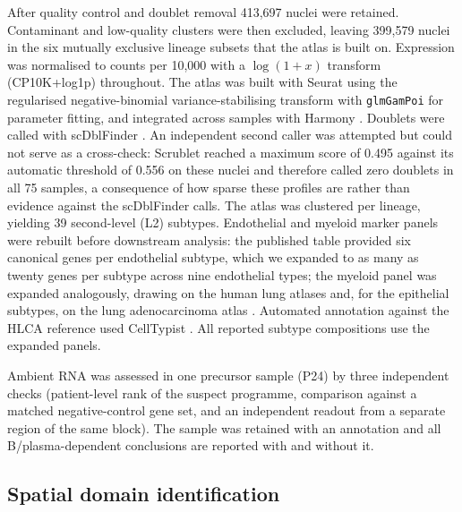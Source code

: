 After quality control and doublet removal 413,697 nuclei were retained. Contaminant and
low-quality clusters were then excluded, leaving 399,579 nuclei in the six mutually
exclusive lineage subsets that the atlas is built on. Expression was
normalised to counts per 10,000 with a $\log(1+x)$ transform (CP10K+log1p) throughout. The
atlas was built with Seurat \citep{hao2024seurat} using the regularised negative-binomial
variance-stabilising transform \citep{hafemeister2019sctransform} with \texttt{glmGamPoi}
\citep{ahlmanneltze2021glmgampoi} for parameter fitting, and integrated across samples with
Harmony \citep{korsunsky2019harmony}. Doublets were called with scDblFinder
\citep{germain2021scdblfinder}. An independent second caller was attempted but could not
serve as a cross-check: Scrublet \citep{wolock2019scrublet} reached a maximum score of
0.495 against its automatic threshold of 0.556 on these nuclei and therefore called zero
doublets in all 75 samples, a consequence of how sparse these profiles are rather than
evidence against the scDblFinder calls. The atlas was clustered per lineage, yielding 39
second-level
(L2) subtypes. Endothelial and myeloid marker panels were rebuilt before downstream
analysis: the published table provided six canonical genes per endothelial subtype, which
we expanded to as many as twenty genes per subtype across nine endothelial types; the
myeloid panel was expanded analogously, drawing on the human lung atlases
\citep{travaglini2020,habermann2020,vieirabraga2019,sikkema2023} and, for the epithelial
subtypes, on the lung adenocarcinoma atlas \citep{han2024,sinjab2021}. Automated annotation
against the HLCA reference used CellTypist \citep{dominguezconde2022celltypist}. All
reported subtype compositions use the expanded panels.

Ambient RNA was assessed in one precursor sample (P24) by three independent checks
(patient-level rank of the suspect programme, comparison against a matched negative-control
gene set, and an independent readout from a separate region of the same block). The sample
was retained with an annotation and all B/plasma-dependent conclusions are reported with
and without it.

\subsection{Spatial domain identification}


